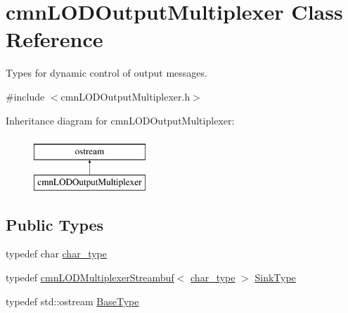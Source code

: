 \hypertarget{classcmn_l_o_d_output_multiplexer}{}\section{cmn\+L\+O\+D\+Output\+Multiplexer Class Reference}
\label{classcmn_l_o_d_output_multiplexer}


Types for dynamic control of output messages.  




{\ttfamily \#include $<$cmn\+L\+O\+D\+Output\+Multiplexer.\+h$>$}

Inheritance diagram for cmn\+L\+O\+D\+Output\+Multiplexer\+:\begin{figure}[H]
\begin{center}
\leavevmode
\includegraphics[height=2.000000cm]{d0/df0/classcmn_l_o_d_output_multiplexer}
\end{center}
\end{figure}
\subsection*{Public Types}
\begin{DoxyCompactItemize}
\item 
typedef char \hyperlink{classcmn_l_o_d_output_multiplexer_a8228345f1af2deaa59cda6f4958c5b3b}{char\+\_\+type}
\item 
typedef \hyperlink{classcmn_l_o_d_multiplexer_streambuf}{cmn\+L\+O\+D\+Multiplexer\+Streambuf}$<$ \hyperlink{classcmn_l_o_d_output_multiplexer_a8228345f1af2deaa59cda6f4958c5b3b}{char\+\_\+type} $>$ \hyperlink{classcmn_l_o_d_output_multiplexer_a8020e1fe3db5ba7fb371c4554b986d6c}{Sink\+Type}
\item 
typedef std\+::ostream \hyperlink{classcmn_l_o_d_output_multiplexer_a5c02280584b487c3d478b0fee8f829ef}{Base\+Type}
\end{DoxyCompactItemize}
